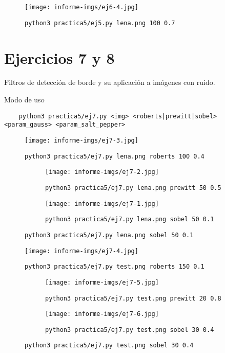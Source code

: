 \documentclass[11pt, spanish]{article}
\begin{document}
\begin{figure}[H]
\centering
  \texttt{[image: informe-imgs/ej6-4.jpg]}
  \caption{\texttt{python3 practica5/ej5.py lena.png 100 0.7}}
\end{figure}

\newpage
\section{Ejercicios 7 y 8}

Filtros de detección de borde y su aplicación a imágenes con ruido.

Modo de uso
\begin{verbatim}
    python3 practica5/ej7.py <img> <roberts|prewitt|sobel> <param_gauss> <param_salt_pepper>
\end{verbatim}


\begin{figure}[H]
\centering
  \texttt{[image: informe-imgs/ej7-3.jpg]}
  \caption{\texttt{python3 practica5/ej7.py lena.png roberts 100 0.4}}
\end{figure}

\begin{figure}[H]
\centering
\begin{subfigure}{0.5\linewidth}
\centering
  \texttt{[image: informe-imgs/ej7-2.jpg]}
  \caption{\texttt{python3 practica5/ej7.py lena.png prewitt 50 0.5}}
\end{subfigure}%
\begin{subfigure}{0.5\linewidth}
\centering
  \texttt{[image: informe-imgs/ej7-1.jpg]}
  \caption{\texttt{python3 practica5/ej7.py lena.png sobel 50 0.1}}
\end{subfigure}
\end{figure}


\begin{figure}[H]
\centering
  \texttt{[image: informe-imgs/ej7-4.jpg]}
  \caption{\texttt{python3 practica5/ej7.py test.png roberts 150 0.1}}
\end{figure}

\begin{figure}[H]
\centering
\begin{subfigure}{0.5\linewidth}
\centering
  \texttt{[image: informe-imgs/ej7-5.jpg]}
  \caption{\footnotesize{\texttt{python3 practica5/ej7.py test.png prewitt 20 0.8}}}
\end{subfigure}%
\begin{subfigure}{0.5\linewidth}
\centering
  \texttt{[image: informe-imgs/ej7-6.jpg]}
  \caption{\footnotesize{\texttt{python3 practica5/ej7.py test.png sobel 30 0.4}}}
\end{subfigure}
\end{figure}
\end{document}
